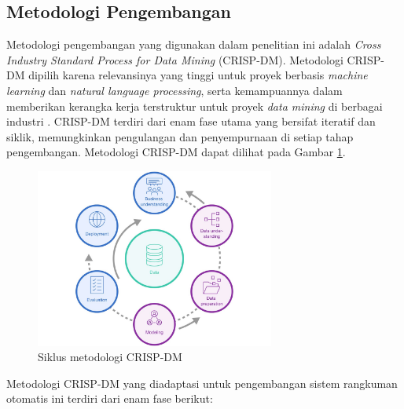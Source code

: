 \subsection{Metodologi Pengembangan}
Metodologi pengembangan yang digunakan dalam penelitian ini adalah \textit{Cross Industry Standard Process for Data Mining} (CRISP-DM). Metodologi CRISP-DM dipilih karena relevansinya yang tinggi untuk proyek berbasis \textit{machine learning} dan \textit{natural language processing}, serta kemampuannya dalam memberikan kerangka kerja terstruktur untuk proyek \textit{data mining} di berbagai industri \autocite{chapman2000}. CRISP-DM terdiri dari enam fase utama yang bersifat iteratif dan siklik, memungkinkan pengulangan dan penyempurnaan di setiap tahap pengembangan. Metodologi CRISP-DM dapat dilihat pada Gambar \ref{fig:crisp-dm}.

\begin{figure}[H]
  \centering
  \includegraphics[width=0.7\textwidth]{image/crisp-dm-diagram.png}
  \caption{Siklus metodologi CRISP-DM \autocite{chapman2000}}
  \label{fig:crisp-dm}
\end{figure}

Metodologi CRISP-DM yang diadaptasi untuk pengembangan sistem rangkuman otomatis ini terdiri dari enam fase berikut:

